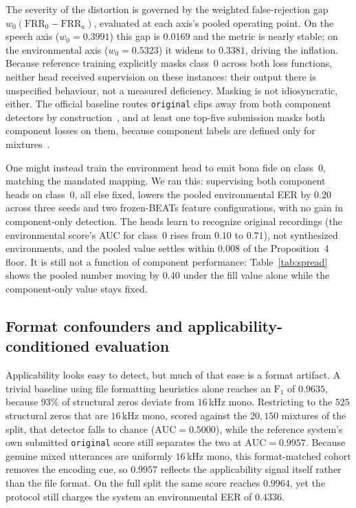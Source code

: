 \documentclass{article}
\begin{document}
The severity of the distortion is governed by the weighted false-rejection gap $w_0(\mathrm{FRR}_0-\mathrm{FRR}_a)$, evaluated at each axis's pooled operating point. On the speech axis ($w_0=0.3991$) this gap is $0.0169$ and the metric is nearly stable; on the environmental axis ($w_0=0.5323$) it widens to $0.3381$, driving the inflation. Because reference training explicitly masks class~$0$ across both loss functions, neither head received supervision on these instances: their output there is unspecified behaviour, not a measured deficiency. Masking is not idiosyncratic, either. The official baseline routes \texttt{original} clips away from both component detectors by construction~\cite{compspoof2026}, and at least one top-five submission masks both component losses on them, because component labels are defined only for mixtures~\cite{sit2026}.

One might instead train the environment head to emit bona fide on class~0, matching the mandated mapping. We ran this: supervising both component heads on class~0, all else fixed, lowers the pooled environmental EER by $0.20$ across three seeds and two frozen-BEATs feature configurations, with no gain in component-only detection. The heads learn to recognize original recordings (the environmental score's AUC for class~0 rises from $0.10$ to $0.71$), not synthesized environments, and the pooled value settles within $0.008$ of the Proposition~4 floor. It is still not a function of component performance: Table~\ref{tab:spread} shows the pooled number moving by $0.40$ under the fill value alone while the component-only value stays fixed.

\subsection{Format confounders and applicability-conditioned evaluation}
\label{sec:confounders_metric_recovery}

Applicability looks easy to detect, but much of that ease is a format artifact. A trivial baseline using file formatting heuristics alone reaches an $\mathrm{F}_1$ of $0.9635$, because $93\%$ of structural zeros deviate from $16$\,kHz mono. Restricting to the $525$ structural zeros that are $16$\,kHz mono, scored against the $20{,}150$ mixtures of the split, that detector falls to chance ($\mathrm{AUC}=0.5000$), while the reference system's own submitted \texttt{original} score still separates the two at $\mathrm{AUC}=0.9957$. Because genuine mixed utterances are uniformly $16$\,kHz mono, this format-matched cohort removes the encoding cue, so $0.9957$ reflects the applicability signal itself rather than the file format. On the full split the same score reaches $0.9964$, yet the protocol still charges the system an environmental EER of $0.4336$.
\end{document}
